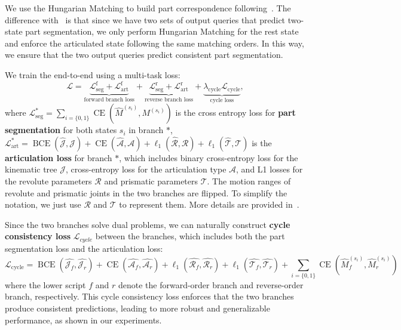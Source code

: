 We use the Hungarian Matching to build part correspondence following~\cite{li2025particulate,carion2020end}. The difference with~\cite{li2025particulate} is that since we have two sets of output queries that predict two-state part segmentation, we only perform Hungarian Matching for the rest state and enforce the articulated state following the same matching orders. 
In this way, we ensure that the two output queries predict consistent part segmentation.

We train the \method end-to-end using a multi-task loss:
\begin{equation}
    \label{eq:total_loss}
    \mathcal{L} = \underbrace{\mathcal{L}_\text{seg}^\text{f}+\mathcal{L}_\text{art}^\text{f}}_\text{forward branch loss} + \underbrace{\mathcal{L}_\text{seg}^\text{r}+\mathcal{L}_\text{art}^\text{r}}_\text{reverse branch loss} +  \underbrace{\lambda_\text{cycle} \mathcal{L}_\text{cycle}}_\text{cycle loss},
\end{equation}
where $\mathcal{L}^{*}_\text{seg}=\sum_{i=\{0,1\}}\operatorname{CE}(\hat{M}^{(s_i)}, M^{(s_i)})$ is the cross entropy loss for \textbf{part segmentation} for both states
$s_i$ in branch $*$,
$\mathcal{L}^{*}_\text{art} = \operatorname{BCE}(\hat{\mathcal{J}},\mathcal{J}) + \operatorname{CE}(\hat{\mathcal{A}},\mathcal{A}) + \ell_1(\hat{\mathcal{R}}, \mathcal{R}) + \ell_1(\hat{\mathcal{T}}, \mathcal{T})$
is the \textbf{articulation loss} for branch $*$,
which includes binary cross-entropy loss for the kinematic tree $\mathcal{J}$, cross-entropy loss for the articulation type $\mathcal{A}$, and L1 losses for the revolute parameters $\mathcal{R}$ and prismatic parameters $\mathcal{T}$.
The motion ranges of revolute and prismatic joints in the two branches are flipped.
To simplify the notation,
we just use $\mathcal{R}$ and $\mathcal{T}$ to represent them.
More details are provided in~.

Since the two branches solve dual problems,
we can naturally construct \textbf{cycle consistency loss}
$\mathcal{L}_{cycle}$ between the branches,
which includes both the part segmentation loss and the articulation loss:
\begin{equation}
    \mathcal{L}_\text{cycle} =
    \operatorname{BCE}(\hat{\mathcal{J}_f},\hat{\mathcal{J}_r}) + \operatorname{CE}(\hat{\mathcal{A}_f},\hat{\mathcal{A}_r}) + \ell_1(\hat{\mathcal{R}_f},\hat{\mathcal{R}_r}) + \ell_1(\hat{\mathcal{T}_f},\hat{\mathcal{T}_r})
    + \sum_{i=\{0,1\}}\operatorname{CE}(\hat{M}^{(s_i)}_f, \hat{M}^{(s_i)}_r)
\end{equation}
where the lower script $f$ and $r$ denote the forward-order branch and reverse-order branch, respectively.
This cycle consistency loss enforces that the two branches produce consistent predictions, leading to more robust and generalizable performance, as shown in our experiments.

